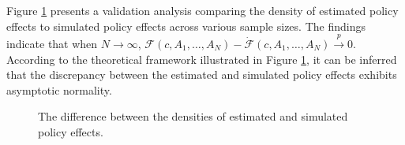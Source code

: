 \documentclass[12pt]{article}
\begin{document}






Figure \ref{fig_theory} presents a validation analysis comparing the density of estimated policy effects to simulated policy effects across various sample sizes. The findings indicate that when $N \rightarrow \infty$, $\mathcal{F}(c, A_1, \dots, A_N) - \dot{\mathcal{F}}(c, A_1, \dots, A_N) \xrightarrow{p} 0$.  According to the theoretical framework illustrated in Figure \ref{fig_theory}, it can be inferred that the discrepancy between the estimated and simulated policy effects exhibits asymptotic normality. 

\begin{figure}[H]
	\centering
    \quad
     \quad 
	\caption{The difference between the densities of estimated and simulated policy effects.  }\label{fig_theory}
\end{figure}
\end{document}
